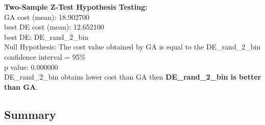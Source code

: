 \documentclass[12pt]{article}
\begin{document}
\noindent
\textbf{Two-Sample Z-Test Hypothesis Testing:}\\
GA cost (mean): 18.902700\\
best DE cost (mean): 12.652100\\
best DE: DE\_rand\_2\_bin\\
Null Hypothesis: The cost value obtained by GA is equal to the DE\_rand\_2\_bin\\
confidence interval = 95\%\\
p value: 0.000000\\
DE\_rand\_2\_bin obtains lower cost than GA then \textbf{DE\_rand\_2\_bin is better than GA}.\\

\begin{landscape}
	\subsection{Summary}
	
\begin{table}[H]
	\centering
	\scriptsize 
\begin{tabular}{rrrrrrrrrrrr}
	\toprule
	

\end{tabular}
\end{table}
\end{landscape}
\end{document}
